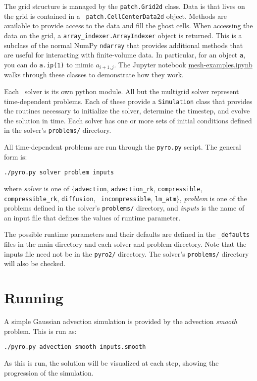 The grid structure is managed by the {\tt patch.Grid2d} class.  Data
is that lives on the grid is contained in a {\tt
  patch.CellCenterData2d} object.  Methods are available to provide
access to the data and fill the ghost cells.  When accessing the data
on the grid, a {\tt array\_indexer.ArrayIndexer} object is returned.
This is a subclass of the normal NumPy {\tt ndarray} that provides
additional methods that are useful for interacting with finite-volume
data.  In particular, for an object {\tt a}, you can do {\tt a.ip(1)}
to mimic $a_{i+1,j}$.  The Jupyter notebook
\href{https://github.com/python-hydro/pyro2/blob/master/mesh/mesh-examples.ipynb}{mesh-examples.ipynb}
walks through these classes to demonstrate how they work.

Each \pyro\ solver is its own python module.  All but the multigrid
solver represent time-dependent problems.  Each of these provide a
{\tt Simulation} class that provides the routines necessary to
initialize the solver, determine the timestep, and evolve the solution
in time.  Each solver has one or more sets of initial conditions
defined in the solver's {\tt problems/} directory.

All time-dependent problems are run through the {\tt pyro.py} script.
The general form is:
\begin{verbatim}
./pyro.py solver problem inputs
\end{verbatim}
 where {\em solver} is one of \{{\tt advection}, {\tt advection\_rk},
 {\tt compressible}, {\tt compressible\_rk}, {\tt diffusion}, {\tt
   incompressible}, {\tt lm\_atm}\}, {\em problem} is one of the
 problems defined in the solver's {\tt problems/} directory, and {\em
   inputs} is the name of an input file that defines the values of
 runtime parameter.

The possible runtime parameters and their defaults are defined in the
{\tt \_defaults} files in the main directory and each solver and
problem directory.  Note that the inputs file need not be in the 
{\tt pyro2/} directory.  The solver's {\tt problems/} directory
will also be checked.

\section{Running \pyro}

A simple Gaussian advection simulation is provided by the advection
{\em smooth} problem.  This is run as:
\begin{verbatim}
./pyro.py advection smooth inputs.smooth
\end{verbatim}
As this is run, the solution will be visualized at each step,
showing the progression of the simulation.  


